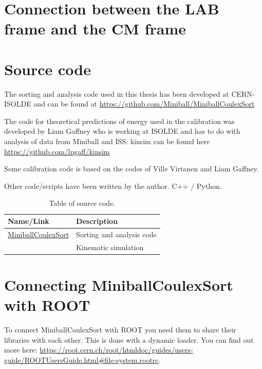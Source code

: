 \documentclass[twoside,english]{uiofysmaster/uiofysmaster}
\begin{document}
\begin{appendices}
\chapter{Connection between the LAB frame and the CM frame}



\chapter{Source code}
The sorting and analysis code used in this thesis has been developed at CERN-ISOLDE and can be found at \url{https://github.com/Miniball/MiniballCoulexSort}

The code for theoretical predictions of energy used in the calibration was developed by Liam Gaffney who is working at ISOLDE and has to do with analysis of data from Miniball and ISS. kinsim can be found here \url{https://github.com/lpgaff/kinsim}

Some calibration code is based on the codes of Ville Virtanen and Liam Gaffney. 

Other code/scripts have been written by the author. C++ / Python.

\begin{table}[h]
  \centering
  \caption{Table of source code.}
    \begin{tabular}{ll}
        \hline
        Name/Link & Description \\
        \hline
         \href{https://github.com/Miniball/MiniballCoulexSort}{MiniballCoulexSort} & Sorting and analysis code \\
         \href{https://github.com/lpgaff/kinsim} & Kinematic simulation \\
        \hline
    \end{tabular}
    \label{tab:code}
\end{table}


\chapter{Connecting MiniballCoulexSort with ROOT}
To connect MiniballCoulexSort with ROOT you need them to share their libraries with each other. This is done with a dynamic loader. You can find out more here: \url{https://root.cern.ch/root/htmldoc/guides/users-guide/ROOTUsersGuide.html#file-system.rootrc}. 


\end{appendices}
\end{document}
